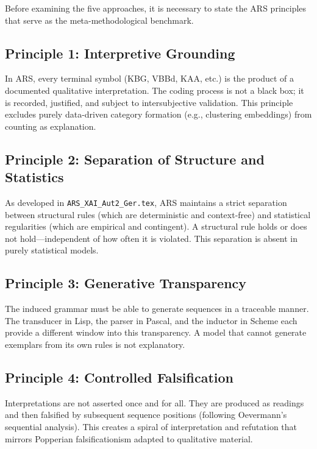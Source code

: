 \documentclass[12pt,a4paper]{article}
\begin{document}
Before examining the five approaches, it is necessary to state the ARS 
principles that serve as the meta-methodological benchmark.

\subsection{Principle 1: Interpretive Grounding}

In ARS, every terminal symbol (KBG, VBBd, KAA, etc.) is the product of a 
documented qualitative interpretation. The coding process is not a black box; 
it is recorded, justified, and subject to intersubjective validation. This 
principle excludes purely data-driven category formation (e.g., clustering 
embeddings) from counting as explanation.

\subsection{Principle 2: Separation of Structure and Statistics}

As developed in \texttt{ARS\_XAI\_Aut2\_Ger.tex}, ARS maintains a strict 
separation between structural rules (which are deterministic and context-free) 
and statistical regularities (which are empirical and contingent). A structural 
rule holds or does not hold—independent of how often it is violated. This 
separation is absent in purely statistical models.

\subsection{Principle 3: Generative Transparency}

The induced grammar must be able to generate sequences in a traceable manner. 
The transducer in Lisp, the parser in Pascal, and the inductor in Scheme each 
provide a different window into this transparency. A model that cannot generate 
exemplars from its own rules is not explanatory.

\subsection{Principle 4: Controlled Falsification}

Interpretations are not asserted once and for all. They are produced as 
readings and then falsified by subsequent sequence positions (following 
Oevermann's sequential analysis). This creates a spiral of interpretation and 
refutation that mirrors Popperian falsificationism adapted to qualitative 
material.
\end{document}
